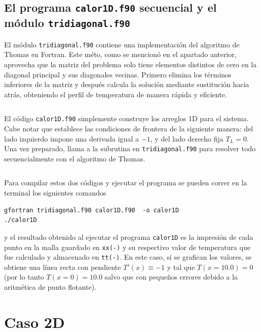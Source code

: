 \documentclass[12pt,twocolumn]{article}
\begin{document}
\subsection[%
El programa \texorpdfstring{\texttt{calor1D.f90}}{calor1D.f90} y el módulo \texorpdfstring{\texttt{tridiagonal.f90}}{tridiagonal.f90} 
]{%
El programa \texorpdfstring{\texttt{calor1D.f90}}{calor1D.f90} secuencial y el módulo \texorpdfstring{\texttt{tridiagonal.f90}}{tridiagonal.f90} 
}

El módulo \texttt{tridiagonal.f90} contiene una implementación del algoritmo de Thomas en Fortran. Este méto, como se mencionó en el apartado anterior, aprovecha que la matriz del problema solo tiene elementos distintos de cero en la diagonal principal y sus diagonales vecinas. Primero elimina los términos inferiores de la matriz y después calcula la solución mediante sustitución hacia atrás, obteniendo el perfil de temperatura de manera rápida y eficiente.

\inputminted{fortran}{tridiagonal.f90}

El código \texttt{calor1D.f90} simplemente construye los arreglos 1D para el sistema. Cabe notar que establece las condiciones de frontera de la siguiente manera: del lado izquierdo impone una derivada igual a $-1$, y del lado derecho fija $T_L = 0$. Una vez preparado, llama a la subrutina en \texttt{tridiagonal.f90} para resolver todo secuencialmente con el algoritmo de Thomas.
\inputminted{fortran}{calor1D.f90}
Para compilar estos dos códigos y ejecutar el programa se pueden correr en la terminal los siguientes comandos
\begin{verbatim}
gfortran tridiagonal.f90 calor1D.f90  -o calor1D
./calor1D
\end{verbatim}
y el resultado obtenido al ejecutar el programa \verb|calor1D| es la impresión de cada punto en la malla guardado en \verb|xx(-)| y su respectivo valor de temperatura que fue calculado y almacenado en \verb|tt(-)|. En este caso, si se grafican los valores, se obtiene una línea recta con pendiente $T'(x)\equiv-1$ y tal que $T(x=10.0)=0$ (por lo tanto $T(x=0)=10.0$ salvo que con pequeños errores debido a la aritmética de punto flotante).
\section{Caso 2D}
\end{document}
